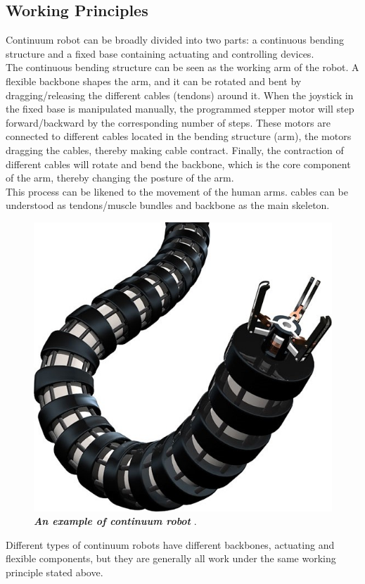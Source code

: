 \subsection{Working Principles}
Continuum robot can be broadly divided into two parts: a continuous bending structure and a fixed base containing actuating and 
controlling devices.\\
The continuous bending structure can be seen as the working arm of the robot. A flexible backbone shapes the arm, and it can be rotated 
and bent by dragging/releasing the different cables (tendons) around it. 
When the joystick in the fixed base is manipulated manually, the programmed stepper motor will step forward/backward by the 
corresponding number of steps. These motors are connected to different cables located in the bending structure (arm), the motors 
dragging the cables, thereby making cable contract. Finally, the contraction of different cables will rotate and bend the backbone, 
which is the core component of the arm, thereby changing the posture of the arm.\\
This process can be likened to the movement of the human arms. cables can be understood as tendons/muscle bundles and backbone as 
the main skeleton.
\begin{figure}[H] %
    \centering %
    \captionsetup{labelsep=colon}
    \includegraphics[width=.8\textwidth]{Image/LR/CR_example.jpg} 
    \caption[An example of continuum robot]
    {\centering \textit{\textbf{An example of continuum robot }}\cite{CR_example}.}
    \label{fig:CR_example}
\end{figure}
\noindent Different types of continuum robots have different backbones, actuating and flexible components, but they are generally all 
work under the same working principle stated above. \\
